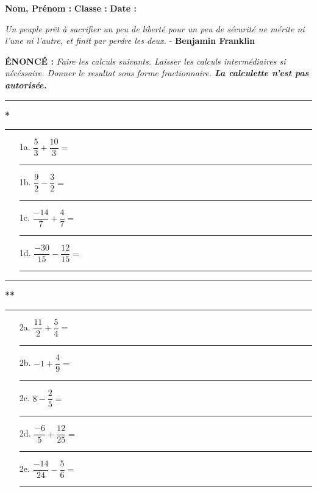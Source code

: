 \documentclass[12pt]{article}
\begin{document}

\textbf{Nom, Prénom :} \hspace{8cm} \textbf{Classe :} \hspace{3cm} \textbf{Date :}

\begin{center}
\textit{Un peuple prêt à sacrifier un peu de liberté pour un peu de sécurité ne mérite ni l'une ni l'autre, et finit par perdre les deux.} - \textbf{Benjamin Franklin}
\end{center}

\textbf{ÉNONCÉ : }
\textit{Faire les calculs suivants. Laisser les calculs intermédiaires si nécéssaire. Donner le resultat sous forme fractionnaire. \textbf{La calculette n'est pas autorisée.}}

\vspace{0.2cm}
\rule{0.5\linewidth}{1pt} \textbf{*} \rule{0.5\linewidth}{1pt}
\vspace{0.2cm}

\begin{enumerate}
\item[1a.] $\dfrac{5}{3}   + \dfrac{10}{3}   =$\\
\rule{\linewidth}{0.5pt}
\item[1b.] $\dfrac{9}{2}   - \dfrac{3}{2}    =$\\
\rule{\linewidth}{0.5pt}
\item[1c.] $\dfrac{-14}{7} + \dfrac{4}{7}    =$\\
\rule{\linewidth}{0.5pt}
\item[1d.] $\dfrac{-30}{15} - \dfrac{12}{15} =$\\
\rule{\linewidth}{0.5pt}
\end{enumerate}

\vspace{0.2cm}
\rule{0.49\linewidth}{1pt} \textbf{**} \rule{0.49\linewidth}{1pt}
\vspace{0.2cm}

\begin{enumerate}
\item[2a.] $\dfrac{11}{2}   + \dfrac{5}{4}   =$\\
\rule{\linewidth}{0.5pt}
\item[2b.] $           -1   + \dfrac{4}{9}   =$\\
\rule{\linewidth}{0.5pt}
\item[2c.] $            8   - \dfrac{2}{5}   =$\\
\rule{\linewidth}{0.5pt}
\item[2d.] $\dfrac{-6}{5}   + \dfrac{12}{25} =$\\
\rule{\linewidth}{0.5pt}
\item[2e.] $\dfrac{-14}{24} - \dfrac{5}{6}   =$\\
\rule{\linewidth}{0.5pt}
\end{enumerate}
\end{document}

